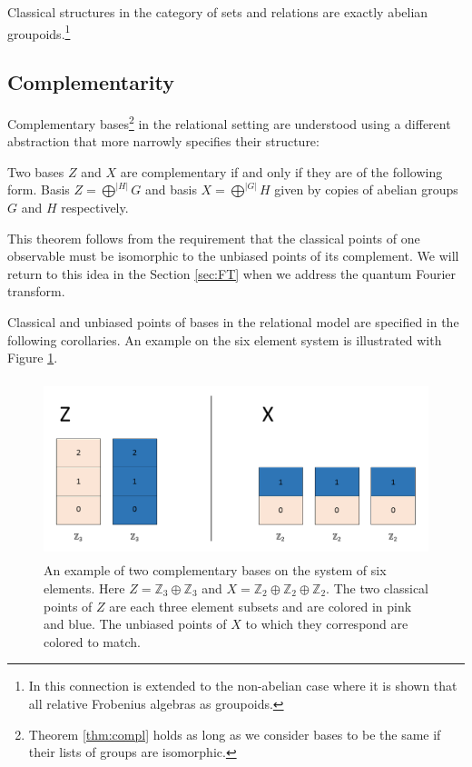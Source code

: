 \begin{lemma}
\label{lem:sdfa-rel}
Classical structures in the category of sets and relations are exactly abelian groupoids.\footnote{In \cite{heunen-relFrob} this connection is extended to the non-abelian case where it is shown that all relative Frobenius algebras as groupoids.}
\end{lemma}

\subsection{Complementarity}
Complementary bases\footnote{Theorem \ref{thm:compl} holds as long as we consider bases to be the same if their lists of groups are isomorphic.} in the relational setting are understood using a different abstraction that more narrowly specifies their structure:
\begin{theorem}
\label{thm:compl}
Two bases $Z$ and $X$ are complementary if and only if they are of the following form. Basis $Z = \bigoplus^{|H|}G$ and basis $X = \bigoplus^{|G|}H$ given by copies of abelian groups $G$ and $H$ respectively.
\end{theorem}

This theorem follows from the requirement that the classical points of one observable must be isomorphic to the unbiased points of its complement. We will return to this idea in the Section \ref{sec:FT} when we address the quantum Fourier transform.

Classical and unbiased points of bases in the relational model are specified in the following corollaries. An example on the six element system is illustrated with Figure \ref{complEx}.

\begin{figure}[tb]
\begin{center}
\includegraphics[height=14em,natwidth=1091,natheight=468,scale=1]{images/complexample.png}
\end{center}
\caption{An example of two complementary bases on the system of six elements. Here $Z=\mathbb{Z}_3\oplus\mathbb{Z}_3$ and $X = \mathbb{Z}_2\oplus\mathbb{Z}_2\oplus \mathbb{Z}_2$.  The two classical points of $Z$ are each three element subsets and are colored in pink and blue. The unbiased points of $X$ to which they correspond are colored to match.
}
\label{complEx}
\end{figure}

